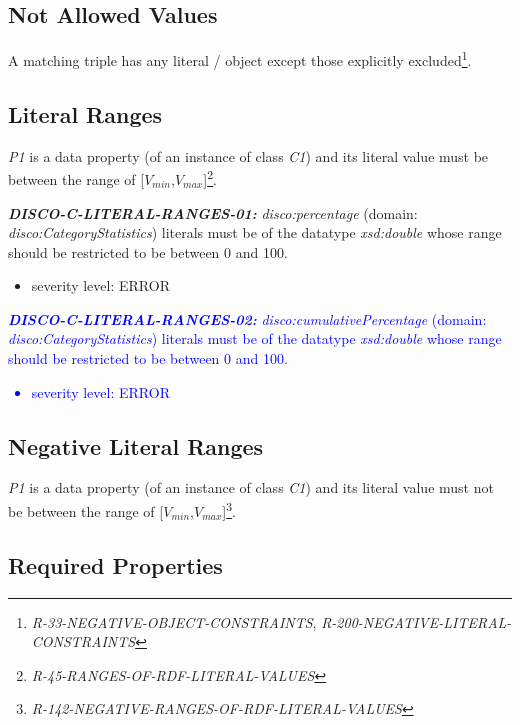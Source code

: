 \documentclass{llncs}
\begin{document}
\subsection{Not Allowed Values}

A matching triple has any literal / object except those explicitly excluded\footnote{\emph{R-33-NEGATIVE-OBJECT-CONSTRAINTS}, \emph{R-200-NEGATIVE-LITERAL-CONSTRAINTS}}.

\subsection{Literal Ranges}

\emph{P1} is a data property (of an instance of class \emph{C1}) and its literal value must be between the range of [$V_{min}$,$V_{max}$]\footnote{{\em R-45-RANGES-OF-RDF-LITERAL-VALUES}}.

\begin{itemize}
	\item \textbf{{\em DISCO-C-LITERAL-RANGES-01:}}
{\em disco:percentage} (domain: {\em disco:CategoryStatistics}) literals must be of the datatype {\em xsd:double} whose range should be restricted to be between 0 and 100.
	\begin{itemize}
		\item severity level: ERROR
	\end{itemize}
	
	\textcolor{blue}{
	\item \textbf{{\em DISCO-C-LITERAL-RANGES-02:}}
{\em disco:cumulativePercentage} (domain: {\em disco:CategoryStatistics}) literals must be of the datatype {\em xsd:double} whose range should be restricted to be between 0 and 100.
	\begin{itemize}
		\item severity level: ERROR
	\end{itemize}
	}
	
\end{itemize}

\subsection{Negative Literal Ranges}

\emph{P1} is a data property (of an instance of class \emph{C1}) and its literal value must not be between the range of [$V_{min}$,$V_{max}$]\footnote{{\em R-142-NEGATIVE-RANGES-OF-RDF-LITERAL-VALUES}}.

\subsection{Required Properties}
\end{document}
